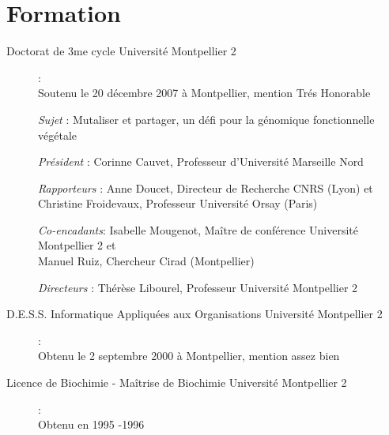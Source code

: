 \section{Formation}
\begin{description}
    \item[Doctorat de 3me cycle Université Montpellier 2] : \\ Soutenu le 20 décembre 2007 à Montpellier, mention Trés Honorable
    \item[]\hspace{0.5cm} \textit{Sujet} :  Mutaliser et partager, un défi pour la génomique fonctionnelle végétale 
    \item[]\hspace{0.5cm}  \textit{Président} : Corinne Cauvet, Professeur d'Université Marseille Nord
    \item[]\hspace{0.5cm}  \textit{Rapporteurs} : Anne Doucet, Directeur de Recherche CNRS (Lyon) et \\
                Christine Froidevaux, Professeur Université Orsay (Paris)
    \item[]\hspace{0.5cm}  \textit{Co-encadants}: Isabelle Mougenot, Maître de conférence Université Montpellier 2 et \\
		Manuel Ruiz, Chercheur Cirad (Montpellier)
    \item[]\hspace{0.5cm} \textit{Directeurs} : Thérèse Libourel, Professeur Université Montpellier 2
   
    
    \item[D.E.S.S. Informatique Appliquées aux Organisations Université Montpellier 2] : \\ Obtenu le 2 septembre 2000 à Montpellier, mention assez bien
    \item[Licence de Biochimie - Maîtrise de Biochimie Université Montpellier 2] : \\ Obtenu en 1995 -1996
	 	
\end{description} 
%
